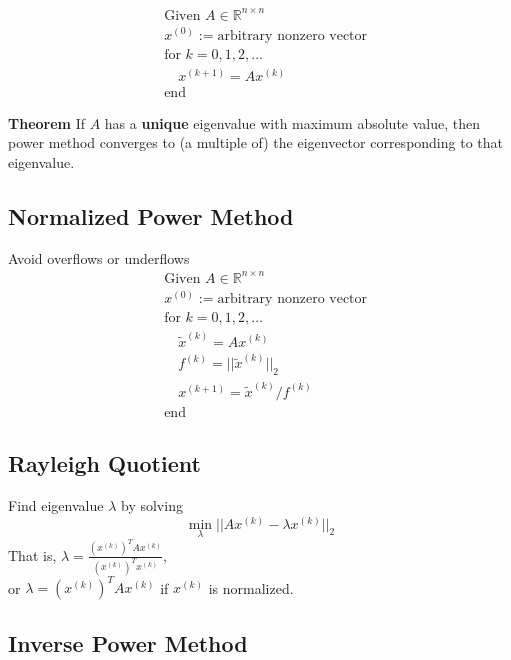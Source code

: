\documentclass[9pt]{article}
\begin{document}
\begin{multicols}{3}
\[
\boxed{
\begin{aligned}
    &\text{Given } A \in \mathbb{R}^{n \times n}\\
    &x^{(0)} := \text{arbitrary nonzero vector}\\
    &\text{for } k = 0, 1, 2, \ldots\\
    & \quad x^{(k+1)} = Ax^{(k)}\\
    &\text{end}
\end{aligned}
}
\]

\textbf{Theorem} If $A$ has a \textbf{unique} eigenvalue with maximum absolute value, then power method converges to (a multiple of) the eigenvector corresponding to that eigenvalue.

\hdashrule{\linewidth}{0.5pt}{1mm 1mm}

\vspace{-0.5cm}
\subsection*{Normalized Power Method}
Avoid overflows or underflows
\[
\boxed{
\begin{aligned}
    &\text{Given } A \in \mathbb{R}^{n \times n}\\
    &x^{(0)} := \text{arbitrary nonzero vector}\\
    &\text{for } k = 0, 1, 2, \ldots\\
    & \quad \tilde{x}^{(k)} = Ax^{(k)}\\
    & \quad f^{(k)} = ||\tilde{x}^{(k)}||_2\\
    & \quad x^{(k+1)} = \tilde{x}^{(k)}/f^{(k)}\\
    &\text{end}
\end{aligned}
}
\]

\hdashrule{\linewidth}{0.5pt}{1mm 1mm}

\vspace{-0.55cm}
\subsection*{Rayleigh Quotient}
Find eigenvalue $\lambda$ by solving 
\[
\min_\lambda ||Ax^{(k)} - \lambda x^{(k)}||_2
\]
That is, $\lambda = \frac{(x^{(k)})^TAx^{(k)}}{(x^{(k)})^Tx^{(k)}}$,\\or $\lambda = (x^{(k)})^TAx^{(k)}$ if $x^{(k)}$ is normalized.

\columnbreak
\subsection*{Inverse Power Method}


\end{multicols}
\end{document}
